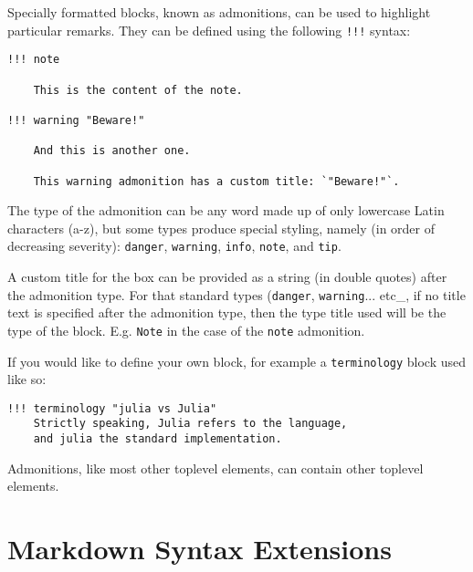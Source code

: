 Specially formatted blocks, known as admonitions, can be used to highlight particular remarks. They can be defined using the following \texttt{!!!} syntax:




\begin{lstlisting}
!!! note

    This is the content of the note.

!!! warning "Beware!"

    And this is another one.

    This warning admonition has a custom title: `"Beware!"`.
\end{lstlisting}



The type of the admonition can be any word made up of only lowercase Latin characters (a-z), but some types produce special styling, namely (in order of decreasing severity): \texttt{danger}, \texttt{warning}, \texttt{info}, \texttt{note}, and \texttt{tip}.



A custom title for the box can be provided as a string (in double quotes) after the admonition type. For that standard types (\texttt{danger}, \texttt{warning}... etc\_, if no title text is specified after the admonition type, then the type title used will be the type of the block. E.g. \texttt{{\textquotedbl}Note{\textquotedbl}} in the case of the \texttt{note} admonition.



If you would like to define your own block, for example a \texttt{terminology}  block used like so:




\begin{lstlisting}
!!! terminology "julia vs Julia"
    Strictly speaking, Julia refers to the language,
    and julia the standard implementation.
\end{lstlisting}



Admonitions, like most other toplevel elements, can contain other toplevel elements.



\hypertarget{10627994621615977524}{}


\section{Markdown Syntax Extensions}



